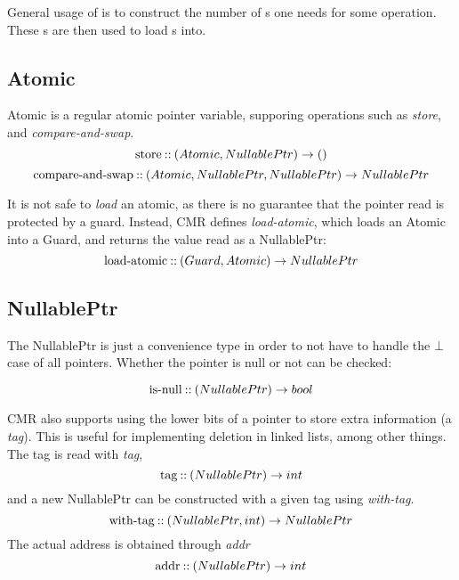 General usage of  is to construct the number of s one needs for some operation.
These s are then used to load s into.


\subsection{Atomic}

Atomic is a regular atomic pointer variable, supporing operations such as \emph{store}, and
\emph{compare-and-swap}.
\begin{equation}\label{eq:atomic-store}
  \text{store\:::\:} (Atomic, NullablePtr) \to ()
\end{equation}
\begin{equation}\label{eq:atomic-cas}
  \text{compare-and-swap\:::\:} (Atomic, NullablePtr, NullablePtr) \to NullablePtr
\end{equation}

It is not safe to \emph{load} an atomic, as there is no guarantee that the
pointer read is protected by a guard. Instead, CMR defines \emph{load-atomic}, which loads an
Atomic into a Guard, and returns the value read as a NullablePtr:
\begin{equation}\label{eq:load-atomic}
  \text{load-atomic\:::\:} (Guard, Atomic) \to NullablePtr
\end{equation}

\subsection{NullablePtr}

The NullablePtr is just a convenience type in order to not have to handle the $\bot$ case of all
pointers. Whether the pointer is null or not can be checked:

\begin{equation}\label{eq:nullable-is-null}
  \text{is-null\:::\:} (NullablePtr) \to bool
\end{equation}

CMR also supports using the lower bits of a pointer to store extra information (a \emph{tag}). This
is useful for implementing deletion in linked lists, among other things.  The tag is read with
\emph{tag},
\begin{equation}\label{eq:ptr-tag}
  \text{tag\:::\:} (NullablePtr) \to int
\end{equation}
and a new NullablePtr can be constructed with a given tag using \emph{with-tag}.
\begin{equation}\label{eq:ptr-with-tag}
  \text{with-tag\:::\:} (NullablePtr, int) \to NullablePtr
\end{equation}
The actual address is obtained through \emph{addr}
\begin{equation}\label{eq:ptr-addr}
  \text{addr\:::\:} (NullablePtr) \to int
\end{equation}


